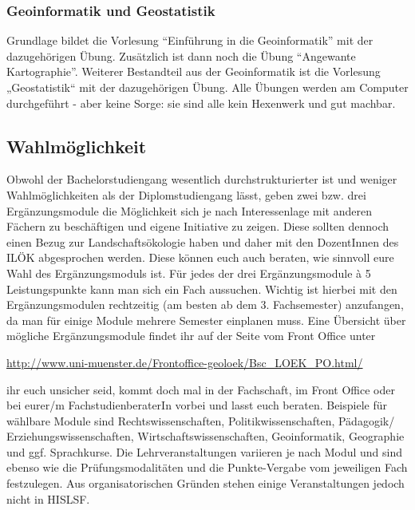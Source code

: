 \subsubsection*{Geoinformatik und Geostatistik}
Grundlage bildet die Vorlesung \enquote{Einführung in die Geoinformatik} mit der dazugehörigen Übung. Zusätzlich ist dann noch die Übung \enquote{Angewante Kartographie}. Weiterer Bestandteil aus der Geoinformatik ist die Vorlesung „Geostatistik“ mit der dazugehörigen Übung. Alle Übungen werden am Computer durchgeführt - aber keine Sorge: sie sind alle kein Hexenwerk und gut machbar.

\subsection*{Wahlmöglichkeit}
Obwohl der Bachelorstudiengang wesentlich durchstrukturierter ist und weniger Wahlmöglichkeiten als der Diplomstudiengang lässt, geben zwei bzw. drei Ergänzungsmodule die Möglichkeit sich je nach Interessenlage mit anderen Fächern zu beschäftigen und eigene Initiative zu zeigen. Diese sollten dennoch einen Bezug zur Landschaftsökologie haben und daher mit den DozentInnen des ILÖK abgesprochen werden. Diese können euch auch beraten, wie sinnvoll eure Wahl des Ergänzungsmoduls ist. Für jedes der drei Ergänzungsmodule à 5 Leistungspunkte kann man sich ein Fach aussuchen. Wichtig ist hierbei mit den Ergänzungsmodulen rechtzeitig (am besten ab dem 3. Fachsemester) anzufangen, da man für einige Module mehrere Semester einplanen muss. Eine Übersicht über mögliche Ergänzungsmodule ﬁndet ihr auf der Seite vom Front Office unter

\url{http://www.uni-muenster.de/Frontoffice-geoloek/Bsc_LOEK_PO.html/}

\Wenn ihr euch unsicher seid, kommt doch mal in der Fachschaft, im Front Office oder bei eurer/m FachstudienberaterIn vorbei und lasst euch beraten. Beispiele für wählbare Module sind Rechtswissenschaften, Politikwissenschaften, Pädagogik/ Erziehungswissenschaften, Wirtschaftswissenschaften, Geoinformatik, Geographie und ggf. Sprachkurse. Die Lehrveranstaltungen variieren je nach Modul und sind ebenso wie die Prüfungsmodalitäten und die Punkte-Vergabe vom jeweiligen Fach festzulegen. Aus organisatorischen Gründen stehen einige Veranstaltungen jedoch nicht in HISLSF.


